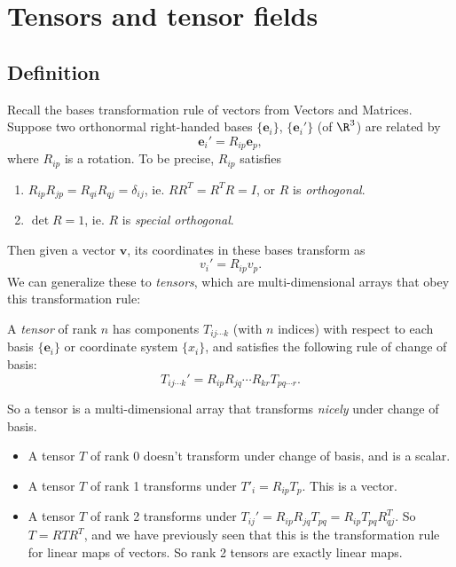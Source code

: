\documentclass[a4paper]{article}
\begin{document}
\section{Tensors and tensor fields}
\subsection{Definition}
Recall the bases transformation rule of vectors from Vectors and Matrices. Suppose two orthonormal right-handed bases $\{\mathbf{e}_i\}$, $\{\mathbf{e}_i'\}$ (of $\R^3$) are related by
\[
  \mathbf{e}_i' = R_{ip} \mathbf{e}_p,
\]
where $R_{ip}$ is a rotation. To be precise, $R_{ip}$ satisfies
\begin{enumerate}
  \item $R_{ip}R_{jp} = R_{qi}R_{qj} = \delta_{ij}$, ie. $RR^T = R^TR = I$, or $R$ is \emph{orthogonal}.
  \item $\det R = 1$, ie. $R$ is \emph{special orthogonal}.
\end{enumerate}
Then given a vector $\mathbf{v}$, its coordinates in these bases transform as
\[
  v_i' = R_{ip}v_p.
\]
We can generalize these to \emph{tensors}, which are multi-dimensional arrays that obey this transformation rule:
\begin{defi}[Tensor]
  A \emph{tensor} of rank $n$ has components $T_{ij\cdots k}$ (with $n$ indices) with respect to each basis $\{\mathbf{e}_i\}$ or coordinate system $\{x_i\}$, and satisfies the following rule of change of basis:
  \[
    T_{ij\cdots k}' = R_{ip}R_{jq}\cdots R_{kr}T_{pq\cdots r}.
  \]
\end{defi}
So a tensor is a multi-dimensional array that transforms \emph{nicely} under change of basis.
\begin{eg}\leavevmode
  \begin{itemize}
    \item A tensor $T$ of rank 0 doesn't transform under change of basis, and is a scalar.
    \item A tensor $T$ of rank 1 transforms under $T'_i = R_{ip}T_p$. This is a vector.
    \item A tensor $T$ of rank 2 transforms under $T_{ij}' = R_{ip} R_{jq} T_{pq} = R_{ip} T_{pq} R^T_{qj}$. So $T = RTR^T$, and we have previously seen that this is the transformation rule for linear maps of vectors. So rank 2 tensors are exactly linear maps.
  \end{itemize}
\end{eg}
\end{document}
